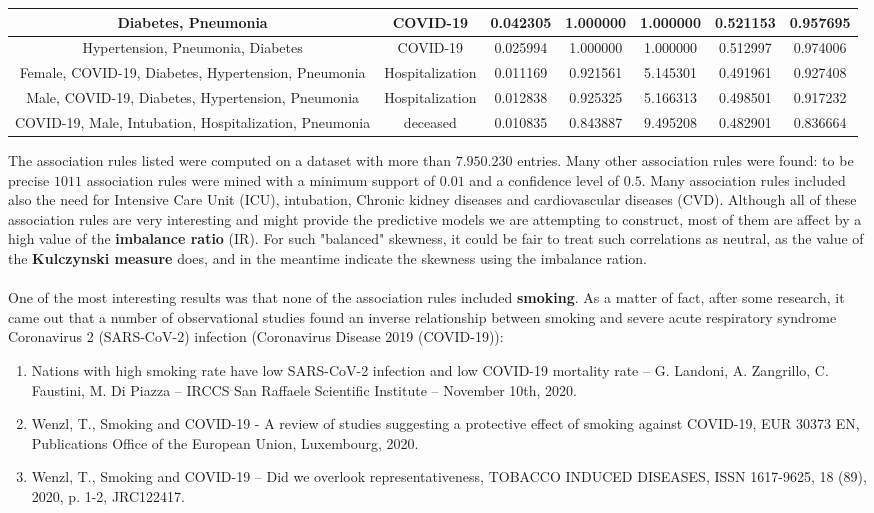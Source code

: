\documentclass[11pt,a4paper]{article}
\begin{document}
\begin{center}
\begin{tabular}{ | c | c | c | c | c | c | c | }
    \hline
    Diabetes, Pneumonia & COVID-19 & 0.042305 & 1.000000 & 1.000000 & {\color{red}0.521153} & {\color{red}0.957695}\\
    \hline
    Hypertension, Pneumonia, Diabetes & COVID-19 & 0.025994 & 1.000000 & 1.000000 & {\color{red}0.512997} & {\color{red}0.974006}\\
    \hline
    Female, COVID-19, Diabetes, Hypertension, Pneumonia & Hospitalization & 0.011169 & 0.921561 & 5.145301 & {\color{red}0.491961} & {\color{red}0.927408}\\
    \hline
    Male, COVID-19, Diabetes, Hypertension, Pneumonia & Hospitalization & 0.012838 & 0.925325 & 5.166313 & {\color{red}0.498501} & {\color{red}0.917232}\\
    \hline
    COVID-19, Male, Intubation, Hospitalization, Pneumonia & deceased & 0.010835 & 0.843887 & 9.495208 & {\color{red}0.482901} & {\color{red}0.836664}\\
    \hline
\end{tabular}
\end{center}
The association rules listed were computed on a dataset with more than
$7.950.230$ entries. Many other association rules were found: to be precise
$1011$ association rules were mined with a minimum support of $0.01$ and a
confidence level of $0.5$. Many association rules included also the need for
Intensive Care Unit (ICU), intubation, Chronic kidney diseases and
cardiovascular diseases (CVD). Although all of these association rules are very
interesting and might provide the predictive models we are attempting to
construct, most of them are affect by a high value of the \textbf{imbalance
ratio} (IR). For such "balanced" skewness, it could be fair to treat such
correlations as neutral, as the value of the \textbf{Kulczynski measure} does,
and in the meantime indicate the skewness using the imbalance ration.\\
\\
One of the most interesting results was that none of the association rules
included \textbf{smoking}. As a matter of fact, after some research, it came
out that a number of observational studies found an inverse relationship between
smoking and severe acute respiratory syndrome Coronavirus 2 (SARS-CoV-2)
infection (Coronavirus Disease 2019 (COVID-19)):
\begin{enumerate}
    \item Nations with high smoking rate have low SARS-CoV-2 infection and low
    COVID-19 mortality rate -- G. Landoni, A. Zangrillo, C. Faustini, M. Di
    Piazza -- IRCCS San Raffaele Scientific Institute -- November 10th, 2020.
    \item Wenzl, T., Smoking and COVID-19 - A review of studies suggesting a
    protective effect of smoking against COVID-19, EUR 30373 EN, Publications
    Office of the European Union, Luxembourg, 2020.
    \item Wenzl, T., Smoking and COVID-19 – Did we overlook representativeness,
    TOBACCO INDUCED DISEASES, ISSN 1617-9625, 18 (89), 2020, p. 1-2, JRC122417.
\end{enumerate}
\end{document}
